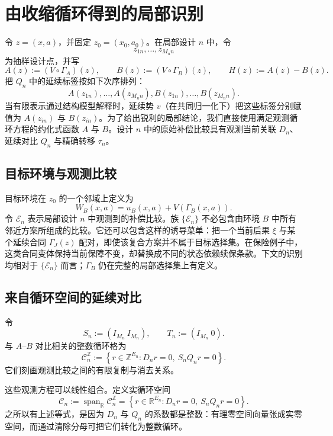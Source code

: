 \section{由收缩循环得到的局部识别}
\label{sec:shrinking}

令 $z=(x,a)$，并固定 $z_0=(x_0,a_0)$。在局部设计 $n$ 中，令
\[
z_{1n},\ldots,z_{M_n n}
\]
为抽样设计点，并写
\[
A(z):=(V\circ\Gamma_A)(z),
\qquad
B(z):=(V\circ\Gamma_B)(z),
\qquad
H(z):=A(z)-B(z).
\]
把 $Q_n$ 中的延续标签按如下次序排列：
\[
A(z_{1n}),\ldots,A(z_{M_n n}),
B(z_{1n}),\ldots,B(z_{M_n n}).
\]
当有限表示通过结构模型解释时，延续势 $v$（在共同归一化下）把这些标签分别赋值为 $A(z_{in})$ 与 $B(z_{in})$。为了给出锐利的局部结论，我们直接使用满足观测循环方程的约化式函数 $A$ 与 $B$。设计 $n$ 中的原始补偿比较具有观测当前关联 $D_n$、延续对比 $Q_n$ 与精确转移 $\tau_n$。

\subsection{目标环境与观测比较}
\label{sec:environment-support}

目标环境在 $z_0$ 的一个邻域上定义为
\[
W_B(x,a)=u_B(x,a)+V(\Gamma_B(x,a)).
\]
令 $\mathcal E_n$ 表示局部设计 $n$ 中观测到的补偿比较。族 $\{\mathcal E_n\}$ 不必包含由环境 $B$ 中所有邻近方案所组成的比较。它还可以包含这样的诱导菜单：把一个当前后果 $\xi$ 与某个延续合同 $\Gamma_J(z)$ 配对，即使该复合方案并不属于目标选择集。在保险例子中，这类合同变体保持当前保障不变，却替换成不同的状态依赖续保条款。下文的识别均相对于 $\{\mathcal E_n\}$ 而言；$\Gamma_B$ 仍在完整的局部选择集上有定义。

\subsection{来自循环空间的延续对比}

令
\[
S_n:=(I_{M_n}\ I_{M_n}),
\qquad
T_n:=(I_{M_n}\ 0).
\]
与 $A$--$B$ 对比相关的整数循环格为
\begin{equation}
\mathcal C_n^{\mathbb Z}
:=
\left\{
r\in\mathbb Z^{E_n}:
D_nr=0,\ S_nQ_nr=0
\right\}.
\label{eq:integer-local-cycles}
\end{equation}
它们刻画观测比较之间的有限复制与消去关系。

这些观测方程可以线性组合。定义实循环空间
\begin{equation}
\mathcal C_n
:=
\operatorname{span}_{\mathbb R}\mathcal C_n^{\mathbb Z}
=
\left\{
r\in\mathbb R^{E_n}:
D_nr=0,\ S_nQ_nr=0
\right\}.
\label{eq:real-local-cycles}
\end{equation}
之所以有上述等式，是因为 $D_n$ 与 $Q_n$ 的系数都是整数：有理零空间向量张成实零空间，而通过清除分母可把它们转化为整数循环。


